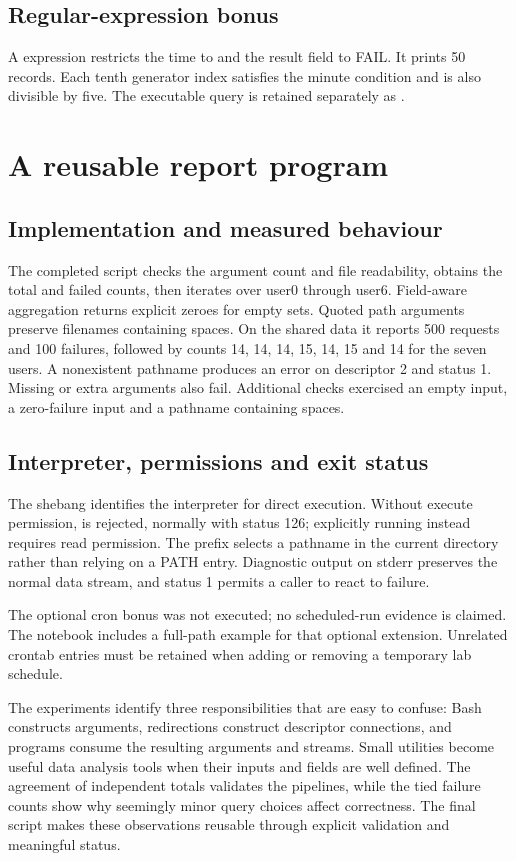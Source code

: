 \documentclass{../latex/utmreport}
\begin{document}
\section{Regular-expression bonus}
A  expression restricts the time to  and the result
field to FAIL. It prints 50 records. Each tenth generator index satisfies the
minute condition and is also divisible by five. The executable query is retained
separately as .

\chapter{A reusable report program}
\section{Implementation and measured behaviour}
The completed script checks the argument count and file readability, obtains the
total and failed counts, then iterates over user0 through user6. Field-aware
aggregation returns explicit zeroes for empty sets. Quoted path arguments preserve
filenames containing spaces.
On the shared data it reports 500 requests and 100 failures, followed by counts
14, 14, 14, 15, 14, 15 and 14 for the seven users.
A nonexistent pathname produces an error on descriptor 2 and status 1. Missing
or extra arguments also fail. Additional checks exercised an empty input, a
zero-failure input and a pathname containing spaces.

\section{Interpreter, permissions and exit status}
The shebang  identifies the interpreter for direct execution.
Without execute permission,  is rejected, normally with status
126; explicitly running  instead requires read permission.
The  prefix selects a pathname in the current directory rather than
relying on a PATH entry. Diagnostic output on stderr preserves the normal data
stream, and status 1 permits a caller to react to failure.

The optional cron bonus was not executed; no scheduled-run evidence is claimed.
The notebook includes a full-path example for that optional extension. Unrelated
crontab entries must be retained when adding or removing a temporary lab schedule.

\utmconclusions
The experiments identify three responsibilities that are easy to confuse: Bash
constructs arguments, redirections construct descriptor connections, and programs
consume the resulting arguments and streams. Small utilities become useful data
analysis tools when their inputs and fields are well defined. The agreement of
independent totals validates the pipelines, while the tied failure counts show
why seemingly minor query choices affect correctness. The final script makes
these observations reusable through explicit validation and meaningful status.
\end{document}
